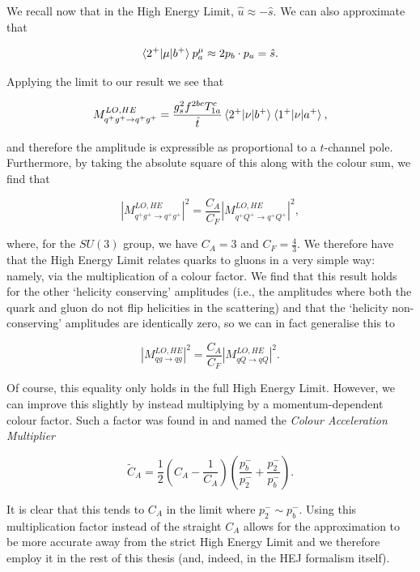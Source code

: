 We recall now that in the High Energy Limit, $\hat{u} \approx -\hat{s}$. We can also approximate that

\begin{equation}
\mathinner{\langle2^+\vert\mu\vert b^+\rangle}_{} p_a^\mu \approx 2 p_b \cdot p_a  = \hat{s}.\end{equation}

Applying the limit to our result we see that 

\begin{equation}
M_{q^+g^+ \to q^+g^+}^{LO, HE} = \frac{g_s^2 f^{2bc}T^c_{1a}}{\hat{t}}\mathinner{\langle2^+\vert\nu\vert b^+\rangle}_{} \mathinner{\langle1^+\vert\nu\vert a^+\rangle}_{},
\end{equation}

and therefore the amplitude is expressible as proportional to a $t$-channel pole. Furthermore, by taking the absolute square of this along with the colour sum, we find that

\begin{equation}
|M_{q^+g^+ \to q^+g^+}^{LO, HE}|^2 = \frac{C_A}{C_F} |M_{q^+Q^+ \to q^+Q^+}^{LO, HE}|^2,
\end{equation}

where, for the $SU(3)$ group, we have $C_A = 3$ and $C_F = \frac{4}{3}$. We therefore have that the High Energy Limit relates quarks to gluons in a very simple way: namely, via the multiplication of a colour factor. We find that this result holds for the other `helicity conserving' amplitudes (i.e., the amplitudes where both the quark and gluon do not flip helicities in the scattering) and that the `helicity non-conserving' amplitudes are identically zero, so we can in fact generalise this to

\begin{equation}
|M_{qg \to qg}^{LO, HE}|^2 = \frac{C_A}{C_F} |M_{qQ \to qQ}^{LO, HE}|^2.
\end{equation}

Of course, this equality only holds in the full High Energy Limit. However, we can improve this slightly by instead multiplying by a momentum-dependent colour factor. Such a factor was found in \cite{Andersen2010} and named the \emph{Colour Acceleration Multiplier}

\begin{equation}
\tilde{C}_A = \frac{1}{2} \left(C_A - \frac{1}{C_A} \right) \left(\frac{p_b^-}{p_2^-} + \frac{p_2^-}{p_b^-} \right).
\end{equation}

It is clear that this tends to $C_A$ in the limit where $p_2^- \sim p_b^-$. Using this multiplication factor instead of the straight $C_A$ allows for the approximation to be more accurate away from the strict High Energy Limit and we therefore employ it in the rest of this thesis (and, indeed, in the HEJ formalism itself). 

